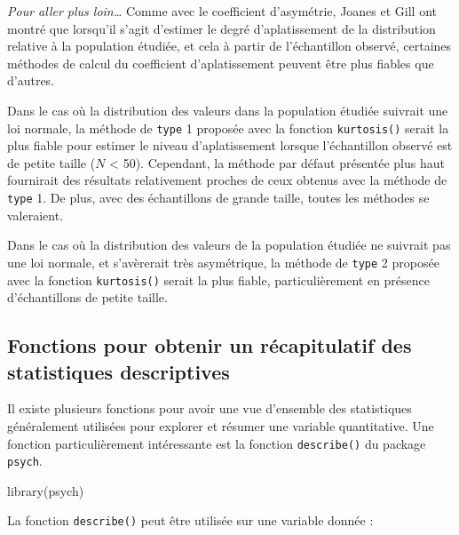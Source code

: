 \documentclass[
]{book}
\newenvironment{Shaded}{\begin{snugshade}}{\end{snugshade}}
\newcommand{\AttributeTok}[1]{\textcolor[rgb]{0.77,0.63,0.00}{#1}}
\newcommand{\FloatTok}[1]{\textcolor[rgb]{0.00,0.00,0.81}{#1}}
\newcommand{\FunctionTok}[1]{\textcolor[rgb]{0.00,0.00,0.00}{#1}}
\newcommand{\NormalTok}[1]{#1}
\newcommand{\SpecialCharTok}[1]{\textcolor[rgb]{0.00,0.00,0.00}{#1}}
\begin{document}
\emph{Pour aller plus loin\ldots{}}
Comme avec le coefficient d'asymétrie, Joanes et Gill \autocite*{joanesComparingMeasuresSample1998} ont montré que lorsqu'il s'agit d'estimer le degré d'aplatissement de la distribution relative à la population étudiée, et cela à partir de l'échantillon observé, certaines méthodes de calcul du coefficient d'aplatissement peuvent être plus fiables que d'autres.

Dans le cas où la distribution des valeurs dans la population étudiée suivrait une loi normale, la méthode de \texttt{type} 1 proposée avec la fonction \texttt{kurtosis()} serait la plus fiable pour estimer le niveau d'aplatissement lorsque l'échantillon observé est de petite taille (\(N\) \textless{} 50). Cependant, la méthode par défaut présentée plus haut fournirait des résultats relativement proches de ceux obtenus avec la méthode de \texttt{type} 1. De plus, avec des échantillons de grande taille, toutes les méthodes se valeraient.

Dans le cas où la distribution des valeurs de la population étudiée ne suivrait pas une loi normale, et s'avèrerait très asymétrique, la méthode de \texttt{type} 2 proposée avec la fonction \texttt{kurtosis()} serait la plus fiable, particulièrement en présence d'échantillons de petite taille.

\hypertarget{fonctions-pour-obtenir-un-ruxe9capitulatif-des-statistiques-descriptives}{%
\subsection{Fonctions pour obtenir un récapitulatif des statistiques descriptives}\label{fonctions-pour-obtenir-un-ruxe9capitulatif-des-statistiques-descriptives}}

Il existe plusieurs fonctions pour avoir une vue d'ensemble des statistiques généralement utilisées pour explorer et résumer une variable quantitative. Une fonction particulièrement intéressante est la fonction \texttt{describe()} du package \texttt{psych}.

\begin{Shaded}
\begin{Highlighting}[]
\FunctionTok{library}\NormalTok{(psych)}
\end{Highlighting}
\end{Shaded}

La fonction \texttt{describe()} peut être utilisée sur une variable donnée :

\begin{Shaded}
\end{Shaded}
\end{document}
